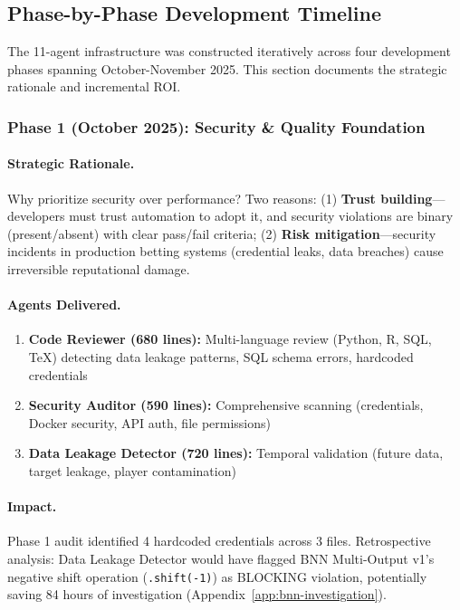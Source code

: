 \subsection{Phase-by-Phase Development Timeline}

The 11-agent infrastructure was constructed iteratively across four development phases spanning October-November 2025. This section documents the strategic rationale and incremental ROI.

\subsubsection{Phase 1 (October 2025): Security \& Quality Foundation}

\paragraph{Strategic Rationale.}
Why prioritize security over performance? Two reasons: (1) \textbf{Trust building}---developers must trust automation to adopt it, and security violations are binary (present/absent) with clear pass/fail criteria; (2) \textbf{Risk mitigation}---security incidents in production betting systems (credential leaks, data breaches) cause irreversible reputational damage.

\paragraph{Agents Delivered.}
\begin{enumerate}[itemsep=2pt,parsep=0pt]
    \item \textbf{Code Reviewer (680 lines):} Multi-language review (Python, R, SQL, TeX) detecting data leakage patterns, SQL schema errors, hardcoded credentials
    \item \textbf{Security Auditor (590 lines):} Comprehensive scanning (credentials, Docker security, API auth, file permissions)
    \item \textbf{Data Leakage Detector (720 lines):} Temporal validation (future data, target leakage, player contamination)
\end{enumerate}

\paragraph{Impact.}
Phase 1 audit identified 4 hardcoded credentials across 3 files. Retrospective analysis: Data Leakage Detector would have flagged BNN Multi-Output v1's negative shift operation (\texttt{.shift(-1)}) as BLOCKING violation, potentially saving 84 hours of investigation (Appendix~\ref{app:bnn-investigation}).

